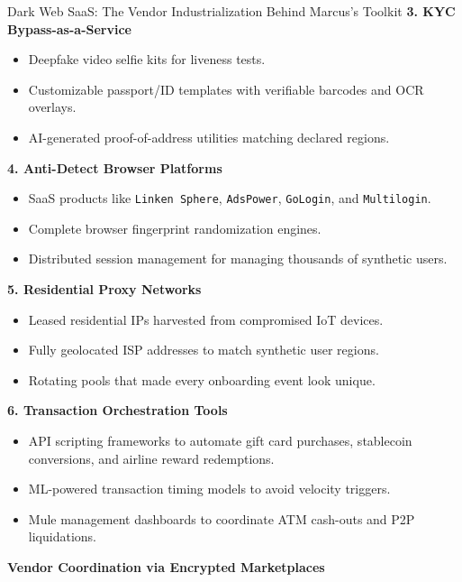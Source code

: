 \begin{HistoricalSidebar}{Dark Web SaaS: The Vendor Industrialization Behind Marcus's Toolkit}
    \textbf{3. KYC Bypass-as-a-Service}
    
    \begin{itemize}
        \item Deepfake video selfie kits for liveness tests.
        \item Customizable passport/ID templates with verifiable barcodes and OCR overlays.
        \item AI-generated proof-of-address utilities matching declared regions.
    \end{itemize}
    
    \textbf{4. Anti-Detect Browser Platforms}
    
    \begin{itemize}
        \item SaaS products like \texttt{Linken Sphere}, \texttt{AdsPower}, \texttt{GoLogin}, and \texttt{Multilogin}.
        \item Complete browser fingerprint randomization engines.
        \item Distributed session management for managing thousands of synthetic users.
    \end{itemize}
    
    \textbf{5. Residential Proxy Networks}
    
    \begin{itemize}
        \item Leased residential IPs harvested from compromised IoT devices.
        \item Fully geolocated ISP addresses to match synthetic user regions.
        \item Rotating pools that made every onboarding event look unique.
    \end{itemize}
    
    \textbf{6. Transaction Orchestration Tools}
    
    \begin{itemize}
        \item API scripting frameworks to automate gift card purchases, stablecoin conversions, and airline reward redemptions.
        \item ML-powered transaction timing models to avoid velocity triggers.
        \item Mule management dashboards to coordinate ATM cash-outs and P2P liquidations.
    \end{itemize}
    
    \medskip
    
    \textbf{Vendor Coordination via Encrypted Marketplaces}
    

\end{HistoricalSidebar}
